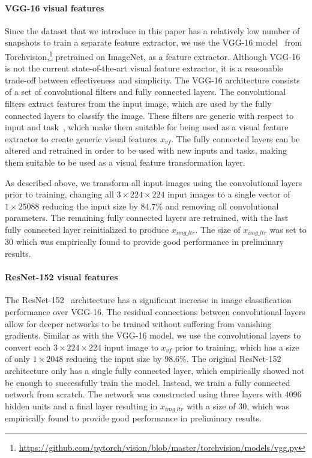\paragraph{VGG-16 visual features}
Since the \datasetname{} data\-set that we introduce in this paper has a relatively low number of snapshots to train a separate feature extractor, we use the VGG-16 model~\cite{simonyan2014very} from Torchvision,\footnote{\url{https://github.com/pytorch/vision/blob/master/torchvision/models/vgg.py}} pretrained on ImageNet, as a feature extractor. 
Although VGG-16 is not the current state-of-the-art visual feature extractor, it is a reasonable trade-off between effectiveness and simplicity.
The VGG-16 architecture consists of a set of convolutional filters and fully connected layers. 
The convolutional filters extract features from the input image, which are used by the fully connected layers to classify the image. 
These filters are generic with respect to input and task~\citep{donahue2014decaf}, which make them suitable for being used as a visual feature extractor to create generic visual features $x_{vf}$. The fully connected layers can be altered and retrained in order to be used with new inputs and tasks, making them suitable to be used as a visual feature transformation layer.

As described above, we transform all input images using the convolutional layers prior to training, changing all $3\times224\times224$ input images to a single vector of $1\times25088$ reducing the input size by $84.7\%$ and removing all convolutional parameters. The remaining fully connected layers are retrained, with the last fully connected layer reinitialized to produce $x_{img\_ltr}$. The size of $x_{img\_ltr}$ was set to $30$ which was empirically found to provide good performance in preliminary results.


\paragraph{ResNet-152 visual features}
The ResNet-152~\cite{he2016deep} architecture has a significant increase in image classification performance over VGG-16. The residual connections between convolutional layers allow for deeper networks to be trained without suffering from vanishing gradients. Similar as with the VGG-16 model, we use the convolutional layers to convert each $3\times224\times224$ input image to $x_{vf}$ prior to training, which has a size of only $1\times2048$ reducing the input size by $98.6\%$. The original ResNet-152 architecture only has a single fully connected layer, which empirically showed not be enough to successfully train the model. Instead, we train a fully connected network from scratch. The network was constructed using three layers with $4096$ hidden units and a final layer resulting in $x_{img\_ltr}$ with a size of $30$, which was empirically found to provide good performance in preliminary results.


